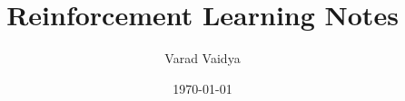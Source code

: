 \documentclass[working,a4paper]{article}
\title{Reinforcement Learning Notes}
\author{Varad Vaidya}
\date{\today}
\begin{document}
  \createintro

  
  \clearpage

  
\end{document}
